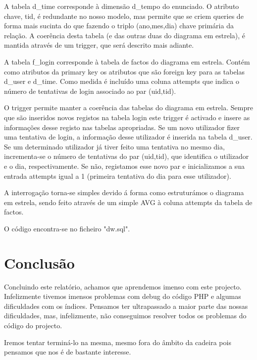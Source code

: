\documentclass[11pt,a4paper]{article}
\begin{document}
A tabela d\_time corresponde à dimensão d\_tempo do enunciado. O atributo chave, tid, é redundante
no nosso modelo, mas permite que se criem queries de forma mais sucinta do que
fazendo o triplo (ano,mes,dia) chave primária da relação. A coerência desta
tabela (e das outras duas do diagrama em estrela), é mantida através de um
trigger, que será descrito mais adiante.

A tabela f\_login corresponde à tabela de factos do diagrama em estrela. Contém como atributos da
primary key os atributos que são foreign key para as tabelas d\_user e d\_time.
Como medida é incluído uma coluna attempts que indica o número de tentativas de
login associado ao par (uid,tid).

O trigger permite manter a coerência das tabelas do diagrama em estrela. Sempre que
são inseridos novos registos na tabela login este trigger é activado e insere as
informações desse registo nas tabelas apropriadas.
Se um novo utilizador fizer uma tentativa de login, a informação desse utilizador é
inserida na tabela d\_user.
Se um determinado utilizador já tiver feito uma tentativa no mesmo dia,
incrementa-se o número de tentativas do par (uid,tid), que identifica o
utilizador e o dia, respectivamente. Se não, registamos esse novo par e
inicializamos a sua entrada attempts igual a 1 (primeira tentativa do dia
para esse utilizador).

A interrogação torna-se simples devido á forma como estruturámos o diagrama em estrela, sendo feito
através de um simple AVG à coluna attempts da tabela de factos.

O código encontra-se no ficheiro "dw.sql".
\newpage

\section{Conclusão}

Concluindo este relatório, achamos que aprendemos imenso com este projecto. Infelizmente tivemos imensos problemas com debug do código PHP e algumas dificuldades com os índices. Pensamos ter ultrapassado a maior parte das nossas dificuldades, mas, infelizmente, não conseguimos resolver todos os problemas do código do projecto.

Iremos tentar terminá-lo na mesma, mesmo fora do âmbito da cadeira pois pensamos que nos é de bastante interesse.
\newpage
\end{document}
